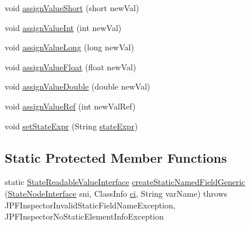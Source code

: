 \begin{DoxyCompactItemize}
void \hyperlink{classgov_1_1nasa_1_1jpf_1_1inspector_1_1server_1_1programstate_1_1_state_value_element_info_field_ad00cd87f04648884c9c6b120de6c5b9a}{assign\+Value\+Short} (short new\+Val)
\item 
void \hyperlink{classgov_1_1nasa_1_1jpf_1_1inspector_1_1server_1_1programstate_1_1_state_value_element_info_field_a4e6966fcf915abefb69591d926b08790}{assign\+Value\+Int} (int new\+Val)
\item 
void \hyperlink{classgov_1_1nasa_1_1jpf_1_1inspector_1_1server_1_1programstate_1_1_state_value_element_info_field_a310476e8f3de984f9ce228bb009ad46c}{assign\+Value\+Long} (long new\+Val)
\item 
void \hyperlink{classgov_1_1nasa_1_1jpf_1_1inspector_1_1server_1_1programstate_1_1_state_value_element_info_field_a12f1d9a32e69b870504604964f144753}{assign\+Value\+Float} (float new\+Val)
\item 
void \hyperlink{classgov_1_1nasa_1_1jpf_1_1inspector_1_1server_1_1programstate_1_1_state_value_element_info_field_a08ad5ccd55ff4886a4892ac22e60d6bc}{assign\+Value\+Double} (double new\+Val)
\item 
void \hyperlink{classgov_1_1nasa_1_1jpf_1_1inspector_1_1server_1_1programstate_1_1_state_value_element_info_field_a98426a6cd8e218c9e601e34f36409bcc}{assign\+Value\+Ref} (int new\+Val\+Ref)
\item 
void \hyperlink{classgov_1_1nasa_1_1jpf_1_1inspector_1_1server_1_1programstate_1_1_state_node_a7ed75cc4ba543123c95e506db6f7b84c}{set\+State\+Expr} (String \hyperlink{classgov_1_1nasa_1_1jpf_1_1inspector_1_1server_1_1programstate_1_1_state_node_a784a38d8edeb54f871891cb63de85585}{state\+Expr})
\end{DoxyCompactItemize}
\subsection*{Static Protected Member Functions}
\begin{DoxyCompactItemize}
\item 
static \hyperlink{interfacegov_1_1nasa_1_1jpf_1_1inspector_1_1server_1_1programstate_1_1_state_readable_value_interface}{State\+Readable\+Value\+Interface} \hyperlink{classgov_1_1nasa_1_1jpf_1_1inspector_1_1server_1_1programstate_1_1_state_value_element_info_field_a70f9fe900184a028889425c4b95611a8}{create\+Static\+Named\+Field\+Generic} (\hyperlink{interfacegov_1_1nasa_1_1jpf_1_1inspector_1_1server_1_1programstate_1_1_state_node_interface}{State\+Node\+Interface} sni, Class\+Info \hyperlink{classgov_1_1nasa_1_1jpf_1_1inspector_1_1server_1_1programstate_1_1_state_value_a0eb4aa1e630ed6372dcfb8c41ae7edc5}{ci}, String var\+Name)  throws J\+P\+F\+Inspector\+Invalid\+Static\+Field\+Name\+Exception, J\+P\+F\+Inspector\+No\+Static\+Element\+Info\+Exception 
\end{DoxyCompactItemize}
